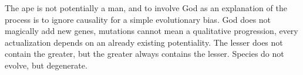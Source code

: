 \begin{footnotesize}
\begin{sffamily}
The ape is not potentially a man, and to involve God as an explanation of the process is to ignore causality for a simple evolutionary bias. God does not magically add new genes, mutations cannot mean a qualitative progression, every actualization depends on an already existing potentiality. The lesser does not contain the greater, but the greater always contains the lesser. Species do not evolve, but degenerate.


\end{sffamily}\end{footnotesize}
